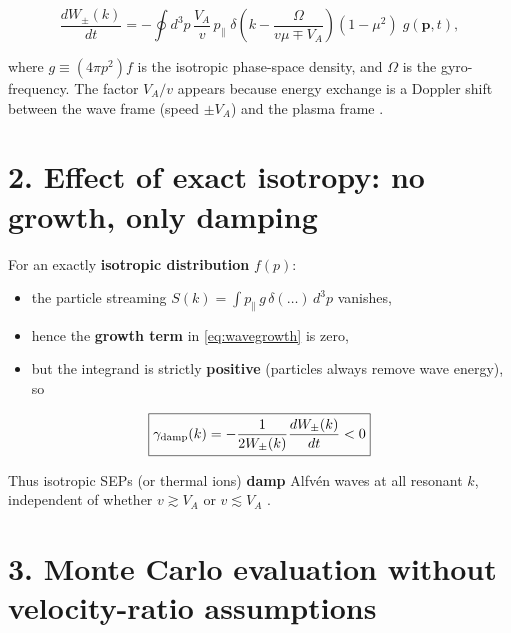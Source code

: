 \begin{equation}
\frac{dW_\pm(k)}{dt}
= - \oint d^3p\, \frac{V_A}{v}\,p_\parallel\;
\delta\left(k - \frac{\Omega}{v\mu \mp V_A}\right)
(1 - \mu^2)\;g(\mathbf{p},t),
\label{eq:wavegrowth}
\end{equation}

where $g \equiv (4\pi p^2)f$ is the isotropic phase-space density, and $\Omega$ is the gyro-frequency. The factor $V_A/v$ appears because energy exchange is a Doppler shift between the wave frame (speed $\pm V_A$) and the plasma frame \cite[§2]{Skilling1975}.

\section*{2. Effect of exact isotropy: no growth, only damping}

For an exactly \textbf{isotropic distribution} $f(p)$:

\begin{itemize}
  \item the particle streaming $S(k)=\int p_\parallel\,g\,\delta(\dots)\,d^3p$ vanishes,
  \item hence the \textbf{growth term} in \eqref{eq:wavegrowth} is zero,
  \item but the integrand is strictly \textbf{positive} (particles always remove wave energy), so
\end{itemize}

\begin{equation}
\boxed{
\gamma_{\rm damp}(k)=
-\frac{1}{2W_\pm(k)}\frac{dW_\pm(k)}{dt} < 0
}
\label{eq:damping}
\end{equation}

Thus isotropic SEPs (or thermal ions) \textbf{damp} Alfvén waves at all resonant $k$, independent of whether $v \gtrsim V_A$ or $v \lesssim V_A$ \cite{Earl1974,Voelk1975,Ruffolo1995}.

\section*{3. Monte Carlo evaluation without velocity-ratio assumptions}


